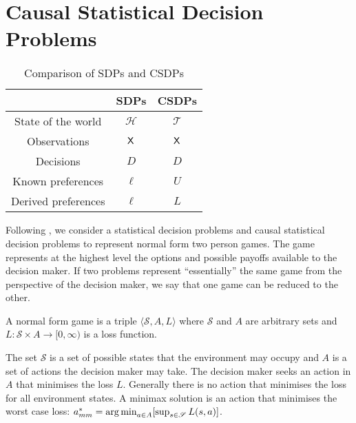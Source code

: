 \section{Causal Statistical Decision Problems}
\begin{table}[ht]
    \centering
\begin{tabular}{ |c|c|c| } 
 \hline
  & SDPs & CSDPs \\ 
 \hline
 State of the world & $\mathscr{H}$ & $\mathscr{T}$ \\ 
 Observations & $\mathsf{X}$ & $\mathsf{X}$ \\ 
 Decisions & $D$ & $D$ \\
 Known preferences & $\ell$ & $U$ \\
 Derived preferences & $\ell$ & $L$\\
 \hline
\end{tabular}
    \caption{Comparison of SDPs and CSDPs}
    \label{tab:sdp_cdp_comparison}
\end{table}



Following \citep{toutenburg_ferguson_1967}, we consider a statistical decision problems and causal statistical decision problems to represent normal form two person games. The game represents at the highest level the options and possible payoffs available to the decision maker. If two problems represent ``essentially'' the same game from the perspective of the decision maker, we say that one game can be reduced to the other.


\begin{definition}
A normal form game is a triple $\langle \mathscr{S}, A, L\rangle$ where $\mathscr{S}$ and $A$ are arbitrary sets and $L:\mathscr{S}\times A\to [0,\infty)$ is a loss function.
\end{definition}
The set $\mathscr{S}$ is a set of possible states that the environment may occupy and $A$ is a set of actions the decision maker may take. The decision maker seeks an action in $A$ that minimises the loss $L$. Generally there is no action that minimises the loss for all environment states. A minimax solution is an action that minimises the worst case loss: $a^*_{mm} = \operatorname*{arg\,min}_{a\in A} [\sup_{s\in \mathscr{S}} L(s,a)]$.

